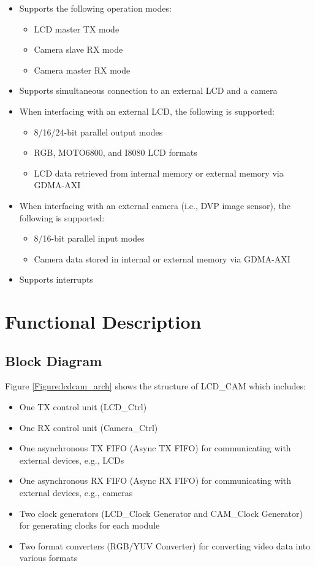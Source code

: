\documentclass[main\_\_EN.tex]{subfiles}
\begin{document}
\begin{itemize}
    \item Supports the following operation modes:
    \begin{itemize}
        \item LCD master TX mode
        \item Camera slave RX mode
        \item Camera master RX mode
    \end{itemize}
    \item Supports simultaneous connection to an external LCD and a camera
    \item When interfacing with an external LCD, the following is supported:
    \begin{itemize}
        \item 8/16/24-bit parallel output modes
        \item RGB, MOTO6800, and I8080 LCD formats
        \item LCD data retrieved from internal memory or external memory via GDMA-AXI
    \end{itemize}
    \item When interfacing with an external camera (i.e., DVP image sensor), the following is supported:
    \begin{itemize}
        \item 8/16-bit parallel input modes
        \item Camera data stored in internal or external memory via GDMA-AXI
    \end{itemize}
    \item Supports interrupts
\end{itemize}

\section{Functional Description}

\subsection{Block Diagram}

Figure \ref{Figure:lcdcam_arch} shows the structure of LCD\_CAM which includes:

\begin{itemize}
    \item One TX control unit (LCD\_Ctrl)
    \item One RX control unit (Camera\_Ctrl)
    \item One asynchronous TX FIFO (Async TX FIFO) for communicating with external devices, e.g., LCDs
    \item One asynchronous RX FIFO (Async RX FIFO) for communicating with external devices, e.g., cameras
    \item Two clock generators (LCD\_Clock Generator and CAM\_Clock Generator) for generating clocks for each module
    \item Two format converters (RGB/YUV Converter) for converting video data into various formats
\end{itemize}
\end{document}

